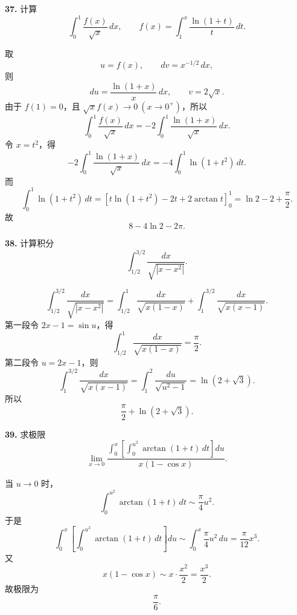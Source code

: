 \begin{problemblock}
\textbf{37.} 计算
\[
\int_0^1\frac{f(x)}{\sqrt{x}}\,dx,\qquad
f(x)=\int_1^x\frac{\ln(1+t)}{t}\,dt.
\]
\end{problemblock}

\begin{solutionblock}
取
\[
u=f(x),\qquad dv=x^{-1/2}\,dx,
\]
则
\[
du=\frac{\ln(1+x)}{x}\,dx,\qquad v=2\sqrt{x}.
\]
由于 \(f(1)=0\)，且 \(\sqrt{x}f(x)\to0\ (x\to0^+)\)，所以
\[
\int_0^1\frac{f(x)}{\sqrt{x}}\,dx
=-2\int_0^1\frac{\ln(1+x)}{\sqrt{x}}\,dx.
\]
令 \(x=t^2\)，得
\[
-2\int_0^1\frac{\ln(1+x)}{\sqrt{x}}\,dx
=-4\int_0^1\ln(1+t^2)\,dt.
\]
而
\[
\int_0^1\ln(1+t^2)\,dt
=\left[t\ln(1+t^2)-2t+2\arctan t\right]_0^1
=\ln2-2+\frac{\pi}{2}.
\]
故
\[
\boxed{8-4\ln2-2\pi}.
\]
\end{solutionblock}

\begin{problemblock}
\textbf{38.} 计算积分
\[
\int_{1/2}^{3/2}\frac{dx}{\sqrt{|x-x^2|}}.
\]
\end{problemblock}

\begin{solutionblock}
\[
\int_{1/2}^{3/2}\frac{dx}{\sqrt{|x-x^2|}}
=\int_{1/2}^{1}\frac{dx}{\sqrt{x(1-x)}}
+\int_1^{3/2}\frac{dx}{\sqrt{x(x-1)}}.
\]
第一段令 \(2x-1=\sin u\)，得
\[
\int_{1/2}^{1}\frac{dx}{\sqrt{x(1-x)}}=\frac{\pi}{2}.
\]
第二段令 \(u=2x-1\)，则
\[
\int_1^{3/2}\frac{dx}{\sqrt{x(x-1)}}
=\int_1^2\frac{du}{\sqrt{u^2-1}}
=\ln(2+\sqrt3).
\]
所以
\[
\boxed{\frac{\pi}{2}+\ln(2+\sqrt3)}.
\]
\end{solutionblock}

\begin{problemblock}
\textbf{39.} 求极限
\[
\lim_{x\to0}
\frac{\displaystyle\int_0^x\left[\int_0^{u^2}\arctan(1+t)\,dt\right]du}
{x(1-\cos x)}.
\]
\end{problemblock}

\begin{solutionblock}
当 \(u\to0\) 时，
\[
\int_0^{u^2}\arctan(1+t)\,dt
\sim \frac{\pi}{4}u^2.
\]
于是
\[
\int_0^x\left[\int_0^{u^2}\arctan(1+t)\,dt\right]du
\sim \int_0^x\frac{\pi}{4}u^2\,du
=\frac{\pi}{12}x^3.
\]
又
\[
x(1-\cos x)\sim x\cdot\frac{x^2}{2}=\frac{x^3}{2}.
\]
故极限为
\[
\boxed{\frac{\pi}{6}}.
\]
\end{solutionblock}

